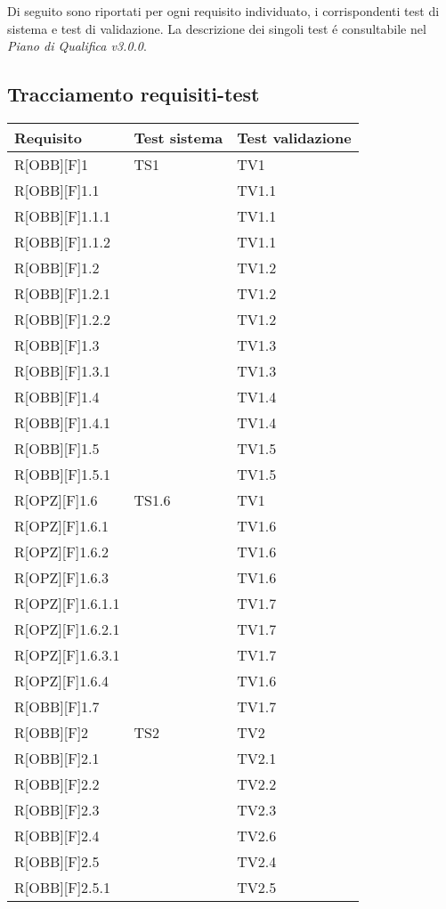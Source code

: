Di seguito sono riportati per ogni requisito individuato, i corrispondenti test di sistema e test di validazione. La descrizione dei singoli test é consultabile nel \textit{Piano di Qualifica v3.0.0}.
\subsection{Tracciamento requisiti-test}
	\begin{table}[h]
		\begin{tabular}{|p{}|p{}|p{}|}
			\toprule
			
			\textbf{Requisito} & \textbf{Test sistema} & \textbf{Test validazione} \\
			
			\midrule

			R[OBB][F]1 & TS1 & TV1 \\ \midrule
			R[OBB][F]1.1 &  & TV1.1 \\ \midrule
			R[OBB][F]1.1.1 &  & TV1.1 \\ \midrule
			R[OBB][F]1.1.2 &  & TV1.1 \\ \midrule
			R[OBB][F]1.2 &  & TV1.2 \\ \midrule
			R[OBB][F]1.2.1 &  & TV1.2 \\ \midrule
			R[OBB][F]1.2.2 &  & TV1.2 \\ \midrule
			R[OBB][F]1.3 &  & TV1.3 \\ \midrule
			R[OBB][F]1.3.1 &  & TV1.3 \\ \midrule
			R[OBB][F]1.4 &  & TV1.4 \\ \midrule
			R[OBB][F]1.4.1 &  & TV1.4 \\ \midrule
			R[OBB][F]1.5 &  & TV1.5 \\ \midrule
			R[OBB][F]1.5.1 &  & TV1.5 \\ \midrule
			R[OPZ][F]1.6 & TS1.6 & TV1 \\ \midrule
			R[OPZ][F]1.6.1 &  & TV1.6 \\ \midrule
			R[OPZ][F]1.6.2 &  & TV1.6 \\ \midrule
			R[OPZ][F]1.6.3 &  & TV1.6 \\ \midrule
			R[OPZ][F]1.6.1.1 &  & TV1.7 \\ \midrule
			R[OPZ][F]1.6.2.1 &  & TV1.7 \\ \midrule
			R[OPZ][F]1.6.3.1 &  & TV1.7 \\ \midrule
			R[OPZ][F]1.6.4 &  & TV1.6 \\ \midrule
			R[OBB][F]1.7 &  & TV1.7 \\ \midrule
			R[OBB][F]2 & TS2 & TV2 \\ \midrule
			R[OBB][F]2.1 &  & TV2.1 \\ \midrule
			R[OBB][F]2.2 &  & TV2.2 \\ \midrule
			R[OBB][F]2.3 &  & TV2.3 \\ \midrule
			R[OBB][F]2.4 &  & TV2.6 \\ \midrule
			R[OBB][F]2.5 &  & TV2.4 \\ \midrule
			R[OBB][F]2.5.1 &  & TV2.5 \\ \midrule
	
	\end{tabular}
	\end{table}
	\newpage
	
